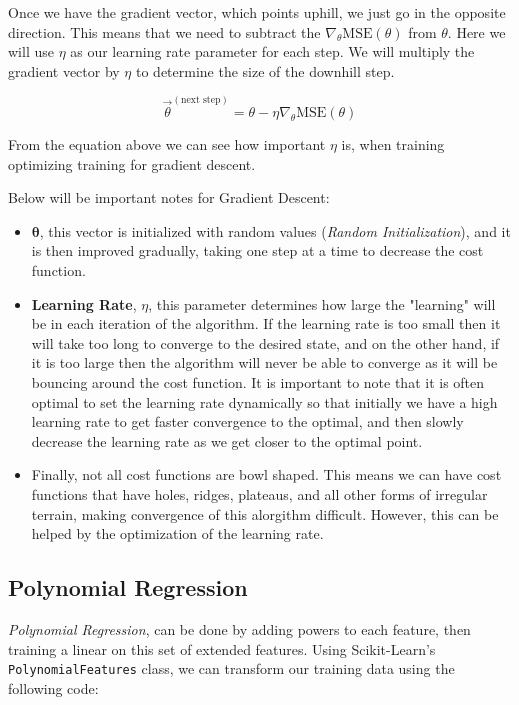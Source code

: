 \noindent
Once we have the gradient vector, which points uphill, we just go in the opposite direction. This means
that we need to subtract the $\nabla_{\theta}\text{MSE}(\theta)$ from $\theta$. Here we will use 
$\eta$ as our learning rate parameter for each step. We will multiply the gradient vector by $\eta$ to 
determine the size of the downhill step.

$$\vec{\theta}^{(\text{next step})} = \theta - \eta \nabla_{\theta} \text{MSE}(\theta)$$ 

\noindent
From the equation above we can see how important $\eta$ is, when training optimizing training for 
gradient descent. 

\noindent
Below will be important notes for Gradient Descent:

\begin{itemize}
    \item $\mathbf{\theta}$, this vector is initialized with random values
    (\textit{Random Initialization}), and it is then improved gradually, taking one step at a
    time to decrease the cost function.

    \item \textbf{Learning Rate}, $\eta$, this parameter determines how large the "learning" will be in each
    iteration of the algorithm. If the learning rate is too small then it will take too
    long to converge to the desired state, and on the other hand, if it is too large then
    the algorithm will never be able to converge as it will be bouncing around the cost
    function. It is important to note that it is often optimal to set the learning rate dynamically so that
    initially we have a high learning rate to get faster convergence to the optimal, and then slowly decrease
    the learning rate as we get closer to the optimal point.

    \item Finally, not all cost functions are bowl shaped. This means we can have cost functions
    that have holes, ridges, plateaus, and all other forms of irregular terrain, making convergence
    of this alorgithm difficult. However, this can be helped by the optimization of the learning rate.
\end{itemize}

\subsection{Polynomial Regression}

\textit{Polynomial Regression}, can be done by adding powers to each feature, then training a linear
on this set of extended features. Using Scikit-Learn's \texttt{PolynomialFeatures} class, we can
transform our training data using the following code: \\


